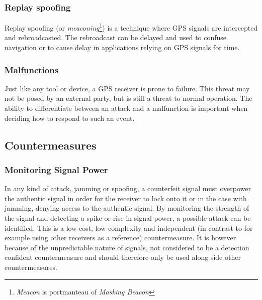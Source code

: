 \documentclass[12pt,english,a4paper]{article}
\begin{document}
\subsubsection{Replay spoofing}\label{rs}
Replay spoofing (or \textit{meaconing}\footnote{\textit{Meacon} is portmanteau of \textit{Masking Beacon}}) is a technique where GPS signals are intercepted and rebroadcasted. The rebroadcast can be delayed and used to confuse navigation or to cause delay in applications relying on GPS signals for time.

\subsubsection{Malfunctions}\label{mf}
Just like any tool or device, a GPS receiver is prone to failure. This threat may not be posed by an external party, but is still a threat to normal operation. The ability to differentiate between an attack and a malfunction is important when deciding how to respond to such an event.

\subsection{Countermeasures}
\subsubsection{Monitoring Signal Power}\label{msp} %
In any kind of attack, jamming or spoofing, a counterfeit signal must overpower the authentic signal in order for the receiver to lock onto it or in the case with jamming, denying access to the authentic signal. By monitoring the strength of the signal and detecting a spike or rise in signal power, a possible attack can be identified. This is a low-cost, low-complexity and independent (in contrast to for example using other receivers as a reference) countermeasure. It is however because of the unpredictable nature of signals, not considered to be a detection confident countermeasure and should therefore only be used along side other countermeasures.\cite{HengChouGao14}
\end{document}
